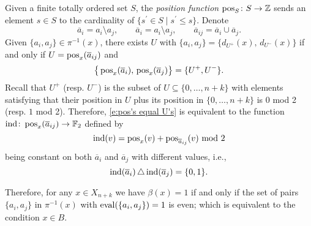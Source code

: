 Given a finite totally ordered set $S$, the \textit{position function} $\operatorname{pos}_S \colon S \to \mathbb{Z}$ sends an element $s \in S$ to the cardinality of $\{s^\prime \in S \mid s^\prime \leq s\}$.
Denote
\begin{equation*}
\overline{a}_{i} = a_i \setminus a_j, \qquad
\overline{a}_{i} = a_i \setminus a_j, \qquad
\overline{a}_{ij} = \overline{a}_i \cup \overline{a}_j.
\end{equation*}
Given $\{a_i, a_j\} \in \pi^{-1}(x)$, there exists $U$ with $\{a_i, a_j\} = \{d_{U^+}(x),\, d_{U^-}(x)\}$
if and only if $U = \operatorname{pos}_{x}(\overline{a}_{ij})$ and
\begin{equation} \label{e:pos's equal U's}
\big\{\operatorname{pos}_{x}(\overline{a}_i),\, \operatorname{pos}_{x}(\overline{a}_j)\big\} = \{U^+, U^-\}.
\end{equation}
Recall that $U^+$ (resp. $U^-$) is the subset of $U \subseteq \{0, \dots, n+k\}$ with elements satisfying that their position in $U$ plus its position in $\{0, \dots, n+k\}$ is $0$ mod 2 (resp. $1$ mod 2).
Therefore, \eqref{e:pos's equal U's} is equivalent to the function $\mathrm{ind} \colon \operatorname{pos}_x(\overline{a}_{ij}) \to \mathbb{F}_2$ defined by
\begin{equation*}
\mathrm{ind}(v) = \operatorname{pos}_{x}(v) + \operatorname{pos}_{\overline{a}_{ij}}(v) \text{ mod }2
\end{equation*}
being constant on both $\overline{a}_i$ and $\overline{a}_j$ with different values, i.e., 
\begin{equation*}
\mathrm{ind}(\overline{a}_i) \operatorname{\triangle} \mathrm{ind}(\overline{a}_j) = \{0,1\}.
\end{equation*}

Therefore, for any $x \in X_{n+k}$ we have $\beta(x) = 1$ if and only if the set of pairs $\{a_i, a_j\}$ in $\pi^{-1}(x)$ with $\operatorname{eval}(\{a_i, a_j\}) = 1$ is even; which is equivalent to the condition $x \in B$.